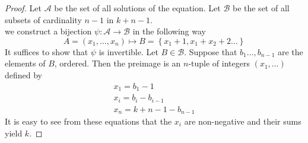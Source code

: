 \documentclass[../main.tex]{subfiles}
\begin{document}
\begin{proof}
Let $ \mathcal{A}$ be the set of all solutions of the equation.
Let  $\mathcal{B}$ be the set of all subsets of cardinality $n-1$  in $k+n-1$.\\
we construct a bijection $\psi: \mathcal{A} \to \mathcal{B}$ in the following way
\[ 
	A = ( x_1, \ldots, x_n ) \mapsto B = \left\{ x_1 +1, x_1+x_2 +2 \ldots \right\} 
\]
It suffices to show that $\psi$ is invertible.
Let $B \in \mathcal{B}$.
Suppose that $b_1 \ldots, b_{n-1}$ are the elements of $B$, ordered.
Then the preimage is an $n$-tuple of integers $( x_1, \ldots) $ defined by
\begin{align*}
x_1 = b_1 -1\\
x_i = b_i - b_{i-1}\\
x_n = k+n-1 - b_{n-1} 
\end{align*}
It is easy to see from these equations that the $x_i$ are non-negative and their sums yield $k$.



\end{proof}




	
\end{document}
